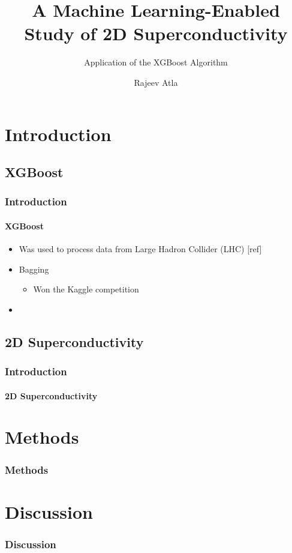 \documentclass[12pt]{beamer}
\title{A Machine Learning-Enabled Study of 2D Superconductivity}
\subtitle{Application of the XGBoost Algorithm}
\author[Rajeev Atla]
{Rajeev Atla}
\institute[JPS]
{
  John P. Stevens High School
}
\begin{document}
\frame{\titlepage}

\section{Introduction}
\subsection{XGBoost}



\begin{frame}
\frametitle{Introduction}
\framesubtitle{XGBoost}

\begin{itemize}
  \item Was used to process data from Large Hadron Collider (LHC) [ref]
  \item Bagging
  \begin{itemize}
    \item Won the Kaggle competition
  \end{itemize}
  \item
\end{itemize}


\end{frame}



\subsection{2D Superconductivity}

\begin{frame}
\frametitle{Introduction}
\framesubtitle{2D Superconductivity}

\end{frame}




\section{Methods}

\begin{frame}
\frametitle{Methods}

\end{frame}



\section{Discussion}

\begin{frame}
\frametitle{Discussion}

\end{frame}
\end{document}
